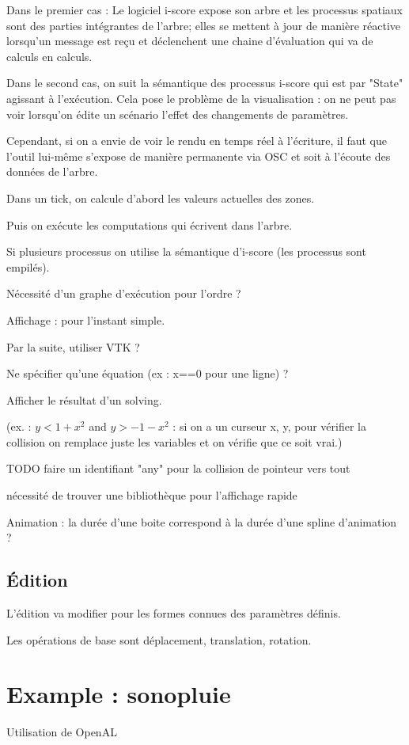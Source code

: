 \documentclass[french]{article}
\begin{document}
Dans le premier cas : 
Le logiciel i-score expose son arbre et les processus spatiaux sont des parties 
intégrantes de l'arbre; elles se mettent à jour de manière réactive lorsqu'un message est reçu
et déclenchent une chaine d'évaluation qui va de calculs en calculs.

Dans le second cas, on suit la sémantique des processus i-score qui est par "State" agissant à l'exécution.
Cela pose le problème de la visualisation : on ne peut pas voir lorsqu'on édite un scénario l'effet
des changements de paramètres.

Cependant, si on a envie de voir le rendu en temps réel à l'écriture, 
il faut que l'outil lui-même s'expose de manière permanente via OSC 
et soit à l'écoute des données de l'arbre.


Dans un tick, on calcule d'abord les valeurs actuelles des zones.

Puis on exécute les computations qui écrivent dans l'arbre.

Si plusieurs processus on utilise la sémantique d'i-score (les processus sont empilés).

Nécessité d'un graphe d'exécution pour l'ordre ?

Affichage : pour l'instant simple. 

Par la suite, utiliser VTK ?

Ne spécifier qu'une équation (ex : x==0 pour une ligne) ?

Afficher le résultat d'un solving.

(ex. : $y < 1 + x^2$ and $y > -1 -x^2$ : si on a un curseur x, y, pour vérifier la collision on remplace juste les variables et on vérifie que ce soit vrai.)

TODO faire un identifiant "any" pour la collision de pointeur vers tout

nécessité de trouver une bibliothèque pour l'affichage rapide
 
Animation : la durée d'une boite correspond à la durée d'une spline d'animation ?
 
\subsection{Édition}
L'édition va modifier pour les formes connues des paramètres définis.

Les opérations de base sont déplacement, translation, rotation.



\section{Example : sonopluie}
Utilisation de OpenAL
\end{document}
